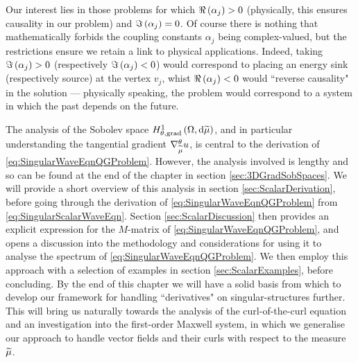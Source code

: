 Our interest lies in those problems for which $\Re\left( \alpha_j \right)>0$ (physically, this ensures causality in our problem) and $\Im\left( \alpha_j \right) = 0$.
Of course there is nothing that mathematically forbids the coupling constants $\alpha_j$ being complex-valued, but the restrictions ensure we retain a link to physical applications. 
Indeed, taking $\Im\left( \alpha_j \right) > 0$ (respectively $\Im\left( \alpha_j \right) < 0$) would correspond to placing an energy sink (respectively source) at the vertex $v_j$, whist $\Re\left( \alpha_j \right)<0$ would ``reverse causality" in the solution --- physically speaking, the problem would correspond to a system in which the past depends on the future.

The analysis of the Sobolev space $H^1_{\theta, \mathrm{grad}}\left( \Omega, \mathrm{d}\widetilde{\mu} \right)$, and in particular understanding the tangential gradient $\nabla^{\theta}_{\widetilde{\mu}}u$, is central to the derivation of \eqref{eq:SingularWaveEqnQGProblem}.
However, the analysis involved is lengthy and so can be found at the end of the chapter in section \ref{sec:3DGradSobSpaces}.
We will provide a short overview of this analysis in section \ref{sec:ScalarDerivation}, before going through the derivation of \eqref{eq:SingularWaveEqnQGProblem} from \eqref{eq:SingularScalarWaveEqn}.
Section \ref{sec:ScalarDiscussion} then provides an explicit expression for the $M$-matrix of \eqref{eq:SingularWaveEqnQGProblem}, and opens a discussion into the methodology and considerations for using it to analyse the spectrum of \eqref{eq:SingularWaveEqnQGProblem}.
We then employ this approach with a selection of examples in section \ref{sec:ScalarExamples}, before concluding.
By the end of this chapter we will have a solid basis from which to develop our framework for handling ``derivatives" on singular-structures further. 
This will bring us naturally towards the analysis of the curl-of-the-curl equation  and an investigation into the first-order Maxwell system, in which we generalise our approach to handle vector fields and their curls with respect to the measure $\widetilde{\mu}$.
